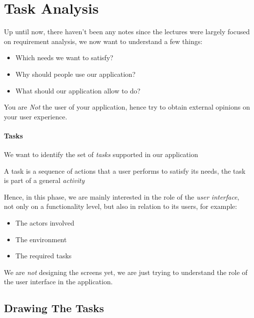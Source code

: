 \documentclass[openright, twoside, twocolumn]{report}
\begin{document}
    \section{Task Analysis}

    Up until now, there haven't been any notes since the lectures were largely focused on requirement analysis, we
    now want to understand a few things:

    \begin{itemize}
      \item Which needs we want to satisfy?
      \item Why should people use our application?
      \item What should our application allow to do?
    \end{itemize}

    \begin{remark}
        You are \emph{Not} the user of your application, hence try to obtain external opinions
        on your user experience.
    \end{remark}

    \paragraph{Tasks}

    We want to identify the set of \emph{tasks} supported in our application

    \begin{definition}
        A task is a sequence of actions that a user performs to satisfy its needs, the task
        is part of a general \emph{activity}
    \end{definition}

    Hence, in this phase, we are mainly interested in the role of the \emph{user interface},
    not only on a functionality level, but also in relation to its users, for example:

    \begin{itemize}
      \item The actors involved
      \item The environment
      \item The required tasks
    \end{itemize}

    We are \emph{not} designing the screens yet, we are just trying to understand the role
    of the user interface in the application.

    \subsection{Drawing The Tasks}
\end{document}
